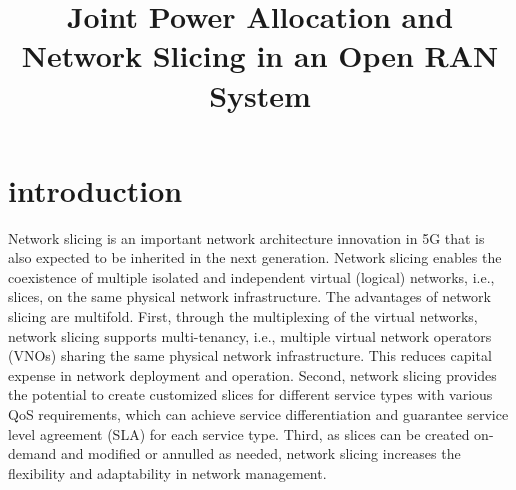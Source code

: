 \documentclass[conference]{IEEEtran}
\begin{document}
\title{Joint Power Allocation and Network Slicing in an Open RAN System \vspace{-.1cm}
}
%
  \author{
  }

\maketitle

\begin{abstract}

\end{abstract}
\begin{IEEEkeywords}

\end{IEEEkeywords}
\section{introduction}
Network slicing is an important network architecture innovation in 5G that is also expected to be inherited in the next generation. Network slicing enables the coexistence of
multiple isolated and independent virtual (logical) networks,
i.e., slices, on the same physical network infrastructure. The
advantages of network slicing are multifold. First, through the
multiplexing of the virtual networks, network slicing supports
multi-tenancy, i.e., multiple virtual network operators (VNOs)
sharing the same physical network infrastructure. This
reduces capital expense in network deployment and operation. Second, network slicing provides the potential to create customized slices for different service types with various
QoS requirements, which can achieve service differentiation
and guarantee service level agreement (SLA) for each service
type. Third, as slices can be created on-demand and modified
or annulled as needed, network slicing increases the flexibility
and adaptability in network management.
\end{document}
